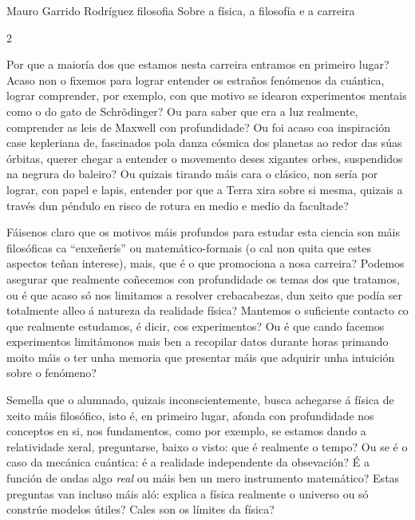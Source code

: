 \Titular*%
{Física e filosofía: Irmás}
{Mauro Garrido Rodríguez}
{filosofia}
{Sobre a física, a filosofía e a carreira}

\begin{multicols}{2}

Por que a maioría dos que estamos nesta carreira entramos en primeiro lugar?
Acaso non o fixemos para lograr entender os estraños fenómenos da cuántica,
lograr comprender, por exemplo, con que motivo se idearon experimentos mentais
como o do gato de Schrödinger? Ou para saber que era a luz realmente,
comprender as leis de Maxwell con profundidade? Ou foi acaso coa inspiración
case kepleriana de, fascinados pola danza cósmica dos planetas ao redor das
súas órbitas, querer chegar a entender o movemento deses xigantes orbes,
suspendidos na negrura do baleiro? Ou quizais tirando máis cara o clásico, non
sería por lograr, con papel e lapis, entender por que a Terra xira sobre si
mesma, quizais a través dun péndulo en risco de rotura en medio e medio da
facultade?

Fáisenos claro que os motivos máis profundos para estudar esta
ciencia son máis filosóficas ca ``enxeñerís'' ou matemático-formais (o cal non
quita que estes aspectos teñan interese), mais, que é o que promociona a nosa
carreira? Podemos asegurar que realmente coñecemos con profundidade os temas
dos que tratamos, ou é que acaso só nos limitamos a resolver crebacabezas, dun
xeito que podía ser totalmente alleo á natureza da realidade física? Mantemos o
suficiente contacto co que realmente estudamos, é dicir, cos experimentos? Ou é
que cando facemos experimentos limitámonos mais ben a recopilar datos durante
horas primando moito máis o ter unha memoria que presentar máis que adquirir
unha intuición sobre o fenómeno?


Semella que o alumnado, quizais
inconscientemente, busca achegarse á física de xeito máis filosófico, isto é,
en primeiro lugar, afonda con profundidade nos conceptos en si, nos
fundamentos, como por exemplo, se estamos dando a relatividade xeral,
preguntarse, baixo o visto: que é realmente o tempo? Ou se é o caso da mecánica
cuántica: é a realidade independente da obsevación? É a función de ondas algo
\textit{real} ou máis ben un mero instrumento matemático? Estas preguntas van
incluso máis aló: explica a física realmente o universo ou só constrúe modelos
útiles? Cales son os límites da física?



\end{multicols}
